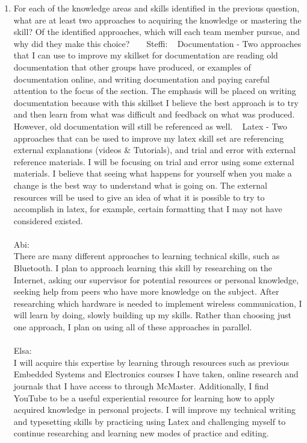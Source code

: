 \documentclass[12pt]{article}
\begin{document}
\begin{enumerate}
  \item For each of the knowledge areas and skills identified in the previous
  question, what are at least two approaches to acquiring the knowledge or
  mastering the skill?  Of the identified approaches, which will each team
  member pursue, and why did they make this choice?
    ~\newline
    ~\newline
Steffi: 
  ~\newline
 Documentation - Two approaches that I can use to improve my skillset for documentation are reading old documentation that other groups have produced, or examples of documentation online, and writing documentation and paying careful attention to the focus of the section.  The emphasis will be placed on writing documentation because with this skillset I believe the best approach is to try and then learn from what was difficult and feedback on what was produced.  However, old documentation will still be referenced as well. 
  ~\newline
  Latex - Two approaches that can be used to improve my latex skill set are referencing external explanations (videos \& Tutorials), and trial and error with external reference materials.  I will be focusing on trial and error using some external materials.  I believe that seeing what happens for yourself when you make a change is the best way to understand what is going on.  The external resources will be used to give an idea of what it is possible to try to accomplish in latex, for example, certain formatting that I may not have considered existed. 
\\
\\
Abi:
\\ There are many different approaches to learning technical skills, such as Bluetooth.  I plan to approach learning this skill by researching on the Internet, asking our supervisor for potential resources or personal knowledge, seeking help from peers who have more knowledge on the subject.  After researching which hardware is needed to implement wireless communication, I will learn by doing, slowly building up my skills. Rather than choosing just one approach, I plan on using all of these approaches in parallel. 
\\
\\
Elsa:
\\ 
  I will acquire this expertise by learning through resources such as previous Embedded Systems and Electronics courses I have taken, online research and journals that I have access to through McMaster. Additionally, I find YouTube to be a useful experiential resource for learning how to apply acquired knowledge in personal projects. I will improve my technical writing and typesetting skills by practicing using Latex and challenging myself to continue researching and learning new modes of practice and editing.

\end{enumerate}
\end{document}
